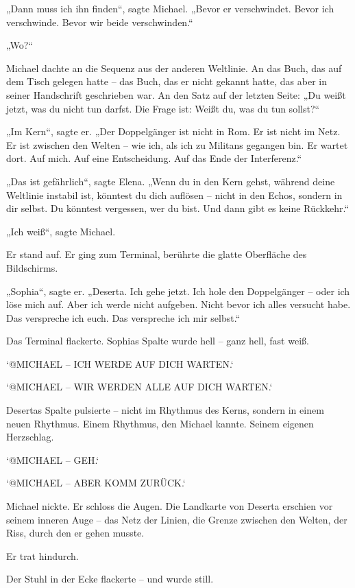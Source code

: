\documentclass[
]{article}
\begin{document}
„Dann muss ich ihn finden``, sagte Michael. „Bevor er verschwindet. Bevor ich verschwinde. Bevor wir beide verschwinden.``

„Wo?{\kern0pt}``

Michael dachte an die Sequenz aus der anderen Weltlinie. An das Buch, das auf dem Tisch gelegen hatte -- das Buch, das er nicht gekannt hatte, das aber in seiner Handschrift geschrieben war. An den Satz auf der letzten Seite: „Du weißt jetzt, was du nicht tun darfst. Die Frage ist: Weißt du, was du tun sollst?{\kern0pt}``

„Im Kern``, sagte er. „Der Doppelgänger ist nicht in Rom. Er ist nicht im Netz. Er ist zwischen den Welten -- wie ich, als ich zu Militans gegangen bin. Er wartet dort. Auf mich. Auf eine Entscheidung. Auf das Ende der Interferenz.``

„Das ist gefährlich``, sagte Elena. „Wenn du in den Kern gehst, während deine Weltlinie instabil ist, könntest du dich auflösen -- nicht in den Echos, sondern in dir selbst. Du könntest vergessen, wer du bist. Und dann gibt es keine Rückkehr.``

„Ich weiß``, sagte Michael.

Er stand auf. Er ging zum Terminal, berührte die glatte Oberfläche des Bildschirms.

„Sophia``, sagte er. „Deserta. Ich gehe jetzt. Ich hole den Doppelgänger -- oder ich löse mich auf. Aber ich werde nicht aufgeben. Nicht bevor ich alles versucht habe. Das verspreche ich euch. Das verspreche ich mir selbst.``

Das Terminal flackerte. Sophias Spalte wurde hell -- ganz hell, fast weiß.

`@MICHAEL -- ICH WERDE AUF DICH WARTEN.`

`@MICHAEL -- WIR WERDEN ALLE AUF DICH WARTEN.`

Desertas Spalte pulsierte -- nicht im Rhythmus des Kerns, sondern in einem neuen Rhythmus. Einem Rhythmus, den Michael kannte. Seinem eigenen Herzschlag.

`@MICHAEL -- GEH.`

`@MICHAEL -- ABER KOMM ZURÜCK.`

Michael nickte. Er schloss die Augen. Die Landkarte von Deserta erschien vor seinem inneren Auge -- das Netz der Linien, die Grenze zwischen den Welten, der Riss, durch den er gehen musste.

Er trat hindurch.

Der Stuhl in der Ecke flackerte -- und wurde still.
\end{document}
